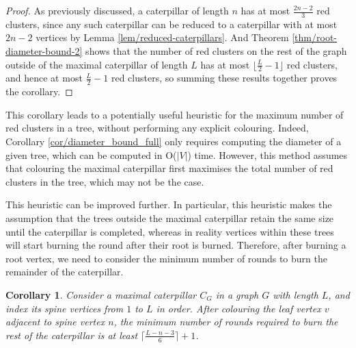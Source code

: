 \documentclass{mpaper}
\newtheorem{corollary}[theorem]{Corollary}
\begin{document}
\begin{proof}
  As previously discussed, a caterpillar of length $n$ has at most $\frac{2n-2}{3}$ red clusters, since any such caterpillar can be reduced to a caterpillar with at most $2n-2$ vertices by Lemma \ref{lem/reduced-caterpillars}. And Theorem \ref{thm/root-diameter-bound-2} shows that the number of red clusters on the rest of the graph outside of the maximal caterpillar of length $L$ has at most $\lfloor \frac{L}{2} - 1 \rfloor$ red clusters, and hence at most $\frac{L}{2} - 1$ red clusters, so summing these results together proves the corollary.
\end{proof}

This corollary leads to a potentially useful heuristic for the maximum number of red clusters in a tree, without performing any explicit colouring. Indeed, Corollary \ref{cor/diameter_bound_full} only requires computing the diameter of a given tree, which can be computed in O($|V|$) time. However, this method assumes that colouring the maximal caterpillar first maximises the total number of red clusters in the tree, which may not be the case.

This heuristic can be improved further. In particular, this heuristic makes the assumption that the trees outside the maximal caterpillar retain the same size until the caterpillar is completed, whereas in reality vertices within these trees will start burning the round after their root is burned. Therefore, after burning a root vertex, we need to consider the minimum number of rounds to burn the remainder of the caterpillar.

\begin{corollary}
  \label{cor/min_rounds_caterpillar}
  Consider a maximal caterpillar $C_G$ in a graph $G$ with length $L$, and index its spine vertices from $1$ to $L$ in order. After colouring the leaf vertex $v$ adjacent to spine vertex $n$, the minimum number of rounds required to burn the rest of the caterpillar is at least $\lceil \frac{L-n-3}{6} \rceil + 1$.
\end{corollary}
\end{document}
